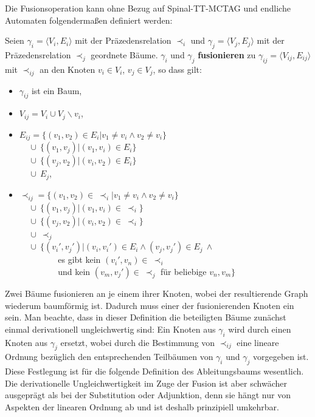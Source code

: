 Die Fusionsoperation kann ohne Bezug auf Spinal-TT-MCTAG und endliche Automaten folgenderma\ss en definiert werden: 
\begin{definition}[Fusion] \label{def-fusion} Seien $\gamma_i = \langle V_i,E_i \rangle$ mit der Präzedensrelation $\prec_i$ und $\gamma_j = \langle V_j,E_j \rangle$ mit der Präzedensrelation $\prec_j$ geordnete Bäume. $\gamma_i$ und $\gamma_j$ {\bf fusionieren} zu $\gamma_{ij} = \langle V_{ij}, E_{ij} \rangle$ mit $\prec_{ij}$ an den Knoten $v_i \in V_i$, $v_j \in V_j$, so dass gilt:
\begin{itemize}
  \item $\gamma_{ij}$ ist ein Baum,
  \item $V_{ij} = V_i \cup V_j \backslash v_i$,
  \item $E_{ij} = \{(v_1,v_2) \in E_i| v_1 \neq v_i \wedge v_2 \neq v_i \}$ \\
                 $~~~~~ \cup \ \{ (v_1, v_j) | (v_1,v_i) \in E_i \}$ \\
                 $~~~~~ \cup \ \{ (v_j, v_2) | (v_i,v_2) \in E_i \}$ \\
                 $~~~~~ \cup \ E_j$, 
  \item $\prec_{ij} = \{ (v_1,v_2) \in \ \prec_i| v_1 \neq v_i \wedge v_2 \neq v_i \}$ \\
                 $~~~~~ \cup \ \{ (v_1, v_j) | (v_1,v_i) \in \ \prec_i \}$ \\
                 $~~~~~ \cup \ \{ (v_j, v_2) | (v_i,v_2) \in \ \prec_i \}$ \\
                 $~~~~~ \cup \ \prec_j$ \\
                 $~~~~~ \cup \ \{ (v_i',v_j') | (v_i,v_i') \in E_i \wedge (v_j,v_j') \in E_j \ \wedge $ \\ 
                 $~~~~~~~~~~~~~~~~~~~$      es gibt kein $ (v_i',v_n) \in \ \prec_i$ \\
                 $~~~~~~~~~~~~~~~~~~~$      und kein $(v_m,v_j') \in \ \prec_j$ für beliebige $v_n, v_m \}$
\end{itemize}
\end{definition}
Zwei Bäume fusionieren an je einem ihrer Knoten, wobei der resultierende Graph wiederum baumförmig ist. Dadurch muss einer der fusionierenden Knoten ein  sein. Man beachte, dass in dieser Definition die beteiligten Bäume zunächst einmal derivationell ungleichwertig sind: Ein Knoten aus $\gamma_i$ wird durch einen Knoten aus $\gamma_j$ ersetzt, wobei durch die Bestimmung von $\prec_{ij}$ eine lineare Ordnung bezüglich den entsprechenden Teilbäumen von $\gamma_i$ und $\gamma_j$ vorgegeben ist. Diese Festlegung ist für die folgende Definition des Ableitungsbaums wesentlich. Die derivationelle Ungleichwertigkeit im Zuge der Fusion ist aber schwächer ausgeprägt als bei der Substitution oder Adjunktion, denn sie hängt nur von Aspekten der linearen Ordnung ab und ist deshalb prinzipiell umkehrbar. 

